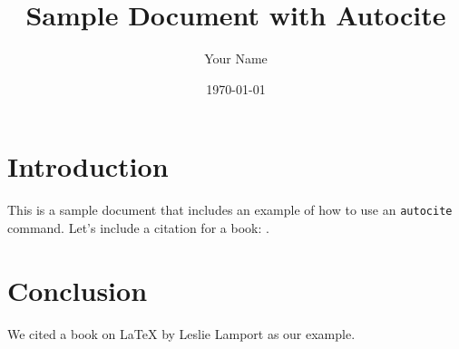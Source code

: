 \documentclass{article}
\begin{document}
\title{Sample Document with Autocite}
\author{Your Name}
\date{\today}
\maketitle

\section{Introduction}

This is a sample document that includes an example of how to use an \texttt{autocite} command. Let’s include a citation for a book: \autocite{Lamport1994}.

\section{Conclusion}

We cited a book on LaTeX by Leslie Lamport as our example.

\printbibliography
\end{document}
